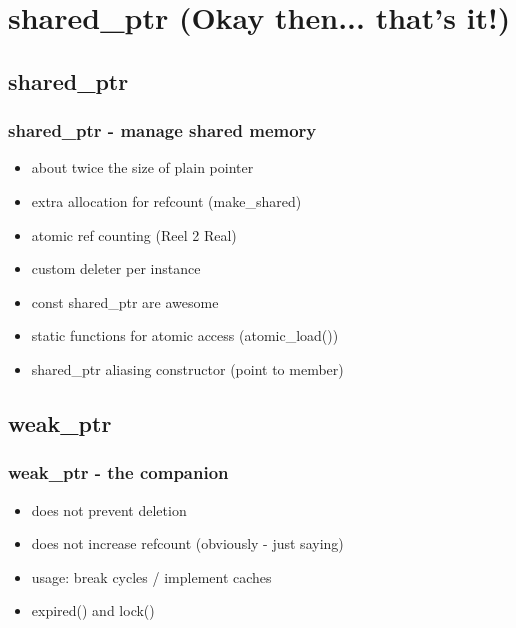 


\section{shared\_ptr (Okay then... that's it!)}



\subsection{shared\_ptr}


\begin{frame}
 \frametitle{shared\_ptr - manage shared memory}
  


\vspace{ 0.1 cm }

\begin{itemize}
  \item about twice the size of plain pointer
  \item extra allocation for refcount (make\_shared)
  \item atomic ref counting (Reel 2 Real)
  \item custom deleter per instance
  \item const shared\_ptr are awesome
  \item static functions for atomic access (atomic\_load())
  \item shared\_ptr aliasing constructor (point to member)
\end{itemize}
  
\end{frame}

\subsection{weak\_ptr}


\begin{frame}
 \frametitle{weak\_ptr - the companion}
  


\vspace{ 0.1 cm }

\begin{itemize}
  \item does not prevent deletion
  \item does not increase refcount (obviously - just saying)
  \item usage: break cycles / implement caches
  \item expired() and lock()
\end{itemize}
  
\end{frame}

